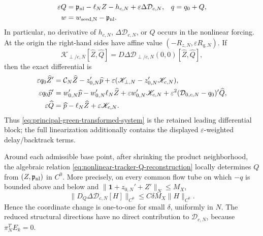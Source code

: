 \begin{proposition}
\begin{align}
 \varepsilon Q
 ={}&\mathfrak p_{\rm nl}-\ell_NZ-h_{c,N}
       +\varepsilon\Delta\mathcal D_{c,N},
 &q={}&q_0+Q,                                      \label{eq:nonlinear-tracker-Q-reconstruction}\\
 w={}&w_{\rm seed,N}-\mathfrak p_{\rm nl}.        \label{eq:nonlinear-tracker-w-reconstruction}
\end{align}
In particular, no derivative of \(h_{c,N}\),
\(\Delta\mathcal D_{c,N}\), or \(Q\) occurs in the nonlinear forcing.
At the origin the right-hand sides have affine value
\((-R_{z,N},\varepsilon R_{q,N})\).  If
\[
 \mathscr K_{\perp/c,N}[\widehat Z,\widehat Q]
 =D\Delta\mathcal D_{\perp/c,N}(0,0)
       [\widehat Z,\widehat Q],
\]
then the exact differential is
\begin{align}
 \varepsilon q_0\widehat Z'
 &=\mathcal C_N\widehat Z-z_{0,N}'\widehat p
   +\varepsilon(\mathscr K_{\perp,N}
                  -z_{0,N}'\mathscr K_{c,N}),\notag\\
 \varepsilon q_0\widehat p'
 &=w_{0,N}'\widehat p-w_{0,N}'\ell_N\widehat Z
   +\varepsilon w_{0,N}'\mathscr K_{c,N}
   +\varepsilon^2(\mathcal D_{0,c,N}-q_0)'\widehat Q,\notag\\
 \varepsilon\widehat Q
 &=\widehat p-\ell_N\widehat Z
   +\varepsilon\mathscr K_{c,N}.                 \label{eq:nonlinear-tracker-full-differential}
\end{align}
Thus \cref{eq:principal-green-transformed-system} is the retained leading
differential block; the full linearization additionally contains the
displayed \(\varepsilon\)-weighted delay/backtrack terms.

Around each admissible base point, after shrinking the product neighborhood,
the algebraic relation
\cref{eq:nonlinear-tracker-Q-reconstruction} locally determines \(Q\) from
\((Z,\mathfrak p_{\rm nl})\) in \(C^0\).  More precisely, on every common
flow tube on which \(-q\) is bounded above and below and
\(\|\mathbf1+z_{0,N}'+Z'\|_N\le M_X\),
\begin{equation}
 \|D_Q\Delta\mathcal D_{c,N}[H]\|_{C^0}
 \le C\delta M_X\|H\|_{C^0}.                     \label{eq:nonlinear-tracker-Q-contraction}
\end{equation}
Hence the coordinate change is one-to-one for small \(\delta\), uniformly
in \(N\).  The reduced structural directions have no direct contribution to
\(\mathcal D_{c,N}\), because \(\pi_N^TE_k=0\).
\end{proposition}

